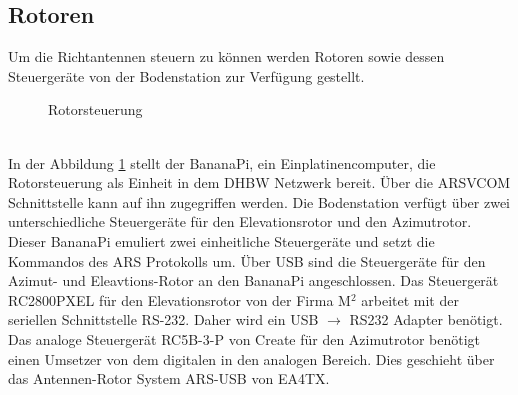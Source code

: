\subsection{Rotoren}
\label{chap:rotoren}
Um die Richtantennen steuern zu können werden Rotoren sowie dessen Steuergeräte von der Bodenstation zur Verfügung gestellt.
\begin{figure}[h]
	\centering
	
	\caption{Rotorsteuerung}
	\label{fig:azel}
\end{figure}\\
In der Abbildung \ref{fig:azel} stellt der BananaPi, ein Einplatinencomputer, die Rotorsteuerung als Einheit in dem DHBW Netzwerk bereit. Über die 
ARSVCOM Schnittstelle kann auf ihn zugegriffen werden. Die Bodenstation verfügt über zwei unterschiedliche Steuergeräte für den Elevationsrotor und 
den Azimutrotor. Dieser BananaPi emuliert zwei einheitliche Steuergeräte und setzt die Kommandos des ARS Protokolls um. Über USB sind die 
Steuergeräte für den Azimut- und Eleavtions-Rotor an den BananaPi angeschlossen. Das Steuergerät RC2800PXEL für den 
Elevationsrotor von der Firma M$^2$ arbeitet mit der seriellen Schnittstelle RS-232. Daher wird ein USB $\rightarrow$ RS232 Adapter benötigt. Das 
analoge Steuergerät RC5B-3-P von Create für den Azimutrotor benötigt einen Umsetzer von dem digitalen in den analogen Bereich. Dies geschieht über 
das Antennen-Rotor System ARS-USB von EA4TX. 
\clearpage
